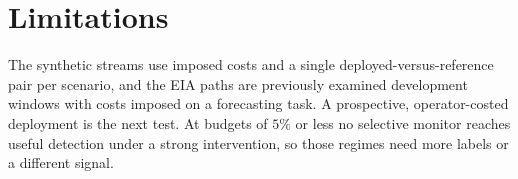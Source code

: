 \section{Limitations}\label{sec:limits}

The synthetic streams use imposed costs and a single deployed-versus-reference pair per scenario, and the EIA paths are previously examined development windows
with costs imposed on a forecasting task. A prospective, operator-costed deployment is the next test. At budgets of $5\%$ or less no selective monitor reaches useful detection
under a strong intervention, so those regimes need more labels or a different signal.
